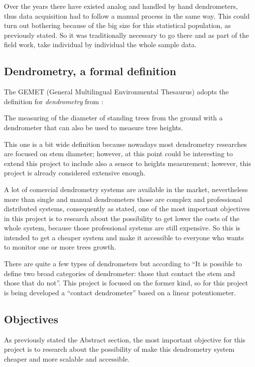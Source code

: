 \documentclass[11pt,a4paper,dvipsnames,twoside]{article}
\begin{document}
Over the years there have existed analog and handled by hand dendrometers, thus data acquisition had to follow a manual process in the same way. This could turn out bothering because of the big size for this statistical population, as previously stated. So it was traditionally necessary to go there and as part of the field work, take individual by individual the whole sample data.

\subsection{Dendrometry, a formal definition}
The GEMET (General Multilingual Environmental Thesaurus) adopts the definition for \textit{dendrometry} from \cite{DictNaturalRes}:

\begin{quoting}
  The measuring of the diameter of standing trees from the ground with a dendrometer that can also be used to measure tree heights.
\end{quoting}

This one is a bit wide definition because nowadays most dendrometry researches are focused on stem diameter; however, at this point could be interesting to extend this project to include also a sensor to heights measurement; however, this project is already considered extensive enough.

A lot of comercial dendrometry systems are available in the market, nevertheless more than single and manual dendrometers those are complex and professional distributed systems, consequently as stated, one of the most important objectives in this project is to research about the possibility to get lower the costs of the whole system, because those professional systems are still expensive. So this is intended to get a cheaper system and make it accessible to everyone who wants to monitor one or more trees growth. 

There are quite a few types of dendrometers but according to \cite{DendroResearch} \enquote{It is possible to define two broad categories of dendrometer: those that contact the stem and those that do not}. This project is focused on the former kind, so for this project is being developed a \enquote{contact dendrometer} based on a linear potentiometer.

\subsection{Objectives}
As previously stated the Abstract section, the most important objective for this project is to research about the possibility of make this dendrometry system cheaper and more scalable and accessible.
\end{document}
